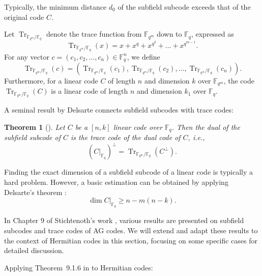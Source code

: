\documentclass[a4paper]{amsart}
\theoremstyle{plain}
\newtheorem{theorem}{Theorem}[section]
\theoremstyle{definition}
\theoremstyle{remark}
\DeclareMathOperator{\trace}{Tr}
\newcommand{\fq}{\mathbb{F}_{q}}
\begin{document}
Typically, the minimum distance $d_0$ of the subfield subcode exceeds that of the original code $C$.

Let $\trace_{\mathbb{F}_{q^m} / \mathbb{F}_q}$ denote the trace function from $\mathbb{F}_{q^m}$ down to $\mathbb{F}_q$, expressed as
\[
	\trace_{\mathbb{F}_{q^m} / \mathbb{F}_q}(x) = x + x^q + x^{q^2} + \ldots + x^{q^{m-1}}.
\]
For any vector $c = (c_1, c_2, \ldots, c_n) \in \mathbb{F}_q^n$, we define
\[
	\trace_{\mathbb{F}_{q^m} / \mathbb{F}_q}(c) = \left( \trace_{\mathbb{F}_{q^m} / \mathbb{F}_q}(c_1), \trace_{\mathbb{F}_{q^m} / \mathbb{F}_q}(c_2), \ldots, \trace_{\mathbb{F}_{q^m} / \mathbb{F}_q}(c_n) \right).
\]
Furthermore, for a linear code $C$ of length $n$ and dimension $k$ over $\mathbb{F}_{q^m}$, the code $\trace_{\mathbb{F}_{q^m} / \mathbb{F}_q}(C)$ is a linear code of length $n$ and dimension $k_1$ over $\mathbb{F}_q$.

A seminal result by Delsarte connects subfield subcodes with trace codes:

\begin{theorem}[\cite{Del75}]\label{delsarte}
	Let $C$ be a $[n,k]$ linear code over $\mathbb{F}_q$. Then the dual of the subfield subcode of $C$ is the trace code of the dual code of $C$, i.e., 
	\[
		(C|_{\mathbb{F}_q})^{\perp} = \trace_{\mathbb{F}_{q^m} / \mathbb{F}_q}(C^{\perp}).
	\]
\end{theorem}
Finding the exact dimension of a subfield subcode of a linear code is typically a hard problem. However, a basic estimation can be obtained by applying Delsarte's theorem {\cite{Del75}}:
\begin{equation}
	\dim C|_{\fq} \geq n - m(n-k).
\end{equation}



In Chapter 9 of Stichtenoth's work \cite{stichtenoth2009algebraic}, various results are presented on subfield subcodes and trace codes of AG codes. We will extend and adapt these results to the context of Hermitian codes in this section, focusing on some specific cases for detailed discussion.



Applying  Theorem~9.1.6 in \cite{stichtenoth2009algebraic} to Hermitian codes:
\end{document}
